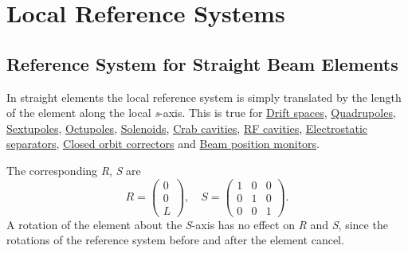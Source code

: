 \section{Local Reference Systems}
\label{sec:local-ref}

\subsection{Reference System for Straight Beam Elements} 
\label{subsec:local-straight}
In straight elements the local reference system is simply translated by
the length of the element along the local \textit{s}-axis. 
This is true for  
\hyperref[sec:drift]{Drift spaces}, 
\hyperref[sec:quadrupole]{Quadrupoles}, 
\hyperref[sec:sextupole]{Sextupoles}, 
\hyperref[sec:octupole]{Octupoles}, 
\hyperref[sec:solenoid]{Solenoids}, 
\hyperref[sec:crab-cavity]{Crab cavities},
\hyperref[sec:rf-cavity]{RF cavities},
\hyperref[sec:separator]{Electrostatic separators},
\hyperref[sec:kicker]{Closed orbit correctors} and
\hyperref[sec:monitor]{Beam position monitors}.


The corresponding \textit{R}, \textit{S} are 
\begin{equation}
R =
 \begin{pmatrix}
  0 \\
  0 \\
  L
 \end{pmatrix}
, \quad
S =
 \begin{pmatrix}
  1 & 0 &  0 \\
  0 & 1 &  0 \\
  0 & 0 &  1
 \end{pmatrix}
.
\end{equation}
A rotation of the element about the \textit{S}-axis has no effect on
\textit{R} and \textit{S}, since the rotations of the reference system
before and after the element cancel.  

